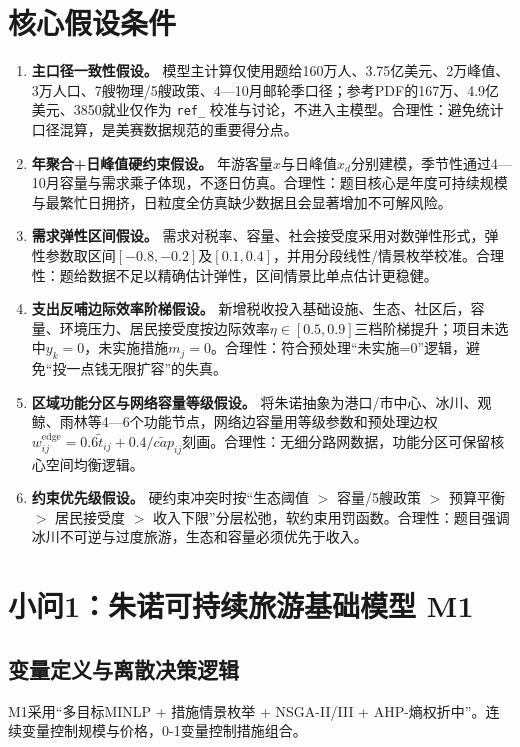 \documentclass[UTF8,a4paper,12pt]{ctexart}
\begin{document}
\section{核心假设条件}

\begin{enumerate}[label=\textbf{A\arabic*.},leftmargin=2.2em]
\item \textbf{主口径一致性假设。} 模型主计算仅使用题给160万人、3.75亿美元、2万峰值、3万人口、7艘物理/5艘政策、4—10月邮轮季口径；参考PDF的167万、4.9亿美元、3850就业仅作为 \texttt{ref\_} 校准与讨论，不进入主模型。合理性：避免统计口径混算，是美赛数据规范的重要得分点。
\item \textbf{年聚合+日峰值硬约束假设。} 年游客量\(x\)与日峰值\(x_d\)分别建模，季节性通过4—10月容量与需求乘子体现，不逐日仿真。合理性：题目核心是年度可持续规模与最繁忙日拥挤，日粒度全仿真缺少数据且会显著增加不可解风险。
\item \textbf{需求弹性区间假设。} 需求对税率、容量、社会接受度采用对数弹性形式，弹性参数取区间\([-0.8,-0.2]\)及\([0.1,0.4]\)，并用分段线性/情景枚举校准。合理性：题给数据不足以精确估计弹性，区间情景比单点估计更稳健。
\item \textbf{支出反哺边际效率阶梯假设。} 新增税收投入基础设施、生态、社区后，容量、环境压力、居民接受度按边际效率\(\eta\in[0.5,0.9]\)三档阶梯提升；项目未选中\(y_k=0\)，未实施措施\(m_j=0\)。合理性：符合预处理“未实施=0”逻辑，避免“投一点钱无限扩容”的失真。
\item \textbf{区域功能分区与网络容量等级假设。} 将朱诺抽象为港口/市中心、冰川、观鲸、雨林等4—6个功能节点，网络边容量用等级参数和预处理边权\(w_{ij}^{\mathrm{edge}}=0.6\tilde t_{ij}+0.4/\tilde{cap}_{ij}\)刻画。合理性：无细分路网数据，功能分区可保留核心空间均衡逻辑。
\item \textbf{约束优先级假设。} 硬约束冲突时按“生态阈值 \(>\) 容量/5艘政策 \(>\) 预算平衡 \(>\) 居民接受度 \(>\) 收入下限”分层松弛，软约束用罚函数。合理性：题目强调冰川不可逆与过度旅游，生态和容量必须优先于收入。
\end{enumerate}

\section{小问1：朱诺可持续旅游基础模型 M1}

\subsection{变量定义与离散决策逻辑}

M1采用“多目标MINLP + 措施情景枚举 + NSGA-II/III + AHP-熵权折中”。连续变量控制规模与价格，0-1变量控制措施组合。
\end{document}
